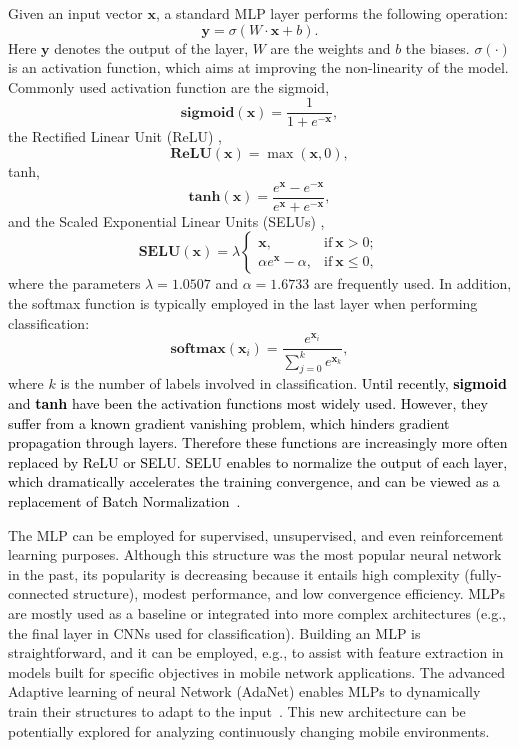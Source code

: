 \documentclass[journal,comsoc,letter]{IEEEtran}
\newcommand{\rev}[1]{\textcolor{black}{#1}}
\begin{document}
Given an input vector $\mathbf{x}$, a standard MLP layer performs the following operation:
\begin{equation}
\mathbf{y} = \sigma(W\cdot \mathbf{x} + b).
\end{equation}
Here $\mathbf{y}$ denotes the output of the layer, $W$ are the weights and $b$ the biases. $\sigma(\cdot)$ is an activation function, which aims at improving the non-linearity of the model. Commonly used activation function are the sigmoid,
\[
\textbf{sigmoid}(\mathbf{x}) = \frac{1}{1+e^{-\mathbf{x}}},
\]
the Rectified Linear Unit (ReLU) \cite{glorot2011deep},
\[
\textbf{ReLU}(\mathbf{x}) = \max(\mathbf{x}, 0),
\]
tanh,
\[
\textbf{tanh}(\mathbf{x}) = \frac{e^{\mathbf{x}}-e^{\mathbf{-x}}}{e^{\mathbf{x}}+e^{\mathbf{-x}}},
\]
and the Scaled Exponential Linear Units (SELUs) \cite{klambauer2017self}, 
$$\textbf{SELU}(\mathbf{x})=\lambda
\begin{cases}
\mathbf{x},& \text{if}\:  \mathbf{x}>0;\\
\alpha e^{\mathbf{x}}-\alpha, & \text{if}\:  \mathbf{x}\leq 0,
\end{cases}$$ 
where the parameters $\lambda=1.0507$ and $\alpha= 1.6733$  are frequently used. In addition, the softmax function is typically employed in the last layer when performing classification:
\[
\textbf{softmax}(\mathbf{x}_i) = \frac{e^{\mathbf{x}_i}}{\sum_{j=0}^k e^{\mathbf{x}_k}},
\]
where $k$ is the number of labels involved in classification. \rev{Until recently, \textbf{sigmoid} and \textbf{tanh} have been the activation functions most widely used. However, they suffer from a known gradient vanishing problem, which hinders gradient propagation through layers. Therefore these functions are increasingly more often replaced by ReLU or SELU. SELU enables to normalize the output of each layer, which dramatically accelerates the training convergence, and can be viewed as a replacement of Batch Normalization~\cite{ioffe2015batch}.}

The MLP can be employed for supervised, unsupervised, and even reinforcement learning purposes. Although this structure was the most popular neural network in the past, its popularity is decreasing because it entails high complexity (fully-connected structure), modest performance, and low convergence efficiency. MLPs are mostly used as a baseline or integrated into more complex architectures (e.g., the final layer in CNNs used for classification). Building an MLP is straightforward, and it can be employed, e.g., to assist with feature extraction in models built for specific objectives in mobile network applications. The advanced Adaptive learning of neural Network (AdaNet) enables MLPs to dynamically train their structures to adapt to the input~\cite{cortes2017adanet}. This new architecture can be potentially explored for analyzing continuously changing mobile environments.
\end{document}
